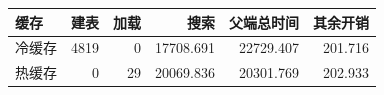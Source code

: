 \begin{tabular}{lrrrrr}
\hline
\textbf{缓存} & \textbf{建表} & \textbf{加载} & \textbf{搜索} & \textbf{父端总时间} & \textbf{其余开销} \\
\hline
冷缓存 & 4819 & 0 & 17708.691 & 22729.407 & 201.716 \\
热缓存 & 0 & 29 & 20069.836 & 20301.769 & 202.933 \\
\hline
\end{tabular}
